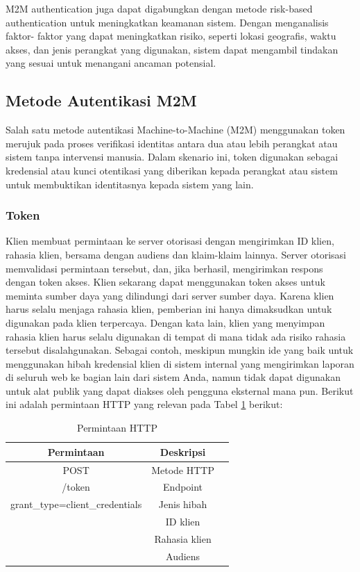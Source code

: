M2M authentication juga dapat digabungkan dengan metode risk-based authentication untuk meningkatkan keamanan sistem. Dengan menganalisis faktor- faktor yang dapat meningkatkan risiko, seperti lokasi geografis, waktu akses, dan jenis perangkat yang digunakan, sistem dapat mengambil tindakan yang sesuai untuk menangani ancaman potensial.

\subsection{Metode Autentikasi M2M}
Salah satu metode autentikasi Machine-to-Machine (M2M) menggunakan token merujuk pada proses verifikasi identitas antara dua atau lebih perangkat atau sistem tanpa intervensi manusia. Dalam skenario ini, token digunakan sebagai kredensial atau kunci otentikasi yang diberikan kepada perangkat atau sistem untuk membuktikan identitasnya kepada sistem yang lain.

\subsubsection{Token}
Klien membuat permintaan ke server otorisasi dengan mengirimkan ID klien, rahasia klien, bersama dengan audiens dan klaim-klaim lainnya. Server otorisasi memvalidasi permintaan tersebut, dan, jika berhasil, mengirimkan respons dengan token akses. Klien sekarang dapat menggunakan token akses untuk meminta sumber daya yang dilindungi dari server sumber daya.
Karena klien harus selalu menjaga rahasia klien, pemberian ini hanya dimaksudkan untuk digunakan pada klien terpercaya. Dengan kata lain, klien yang menyimpan rahasia klien harus selalu digunakan di tempat di mana tidak ada risiko rahasia tersebut disalahgunakan. Sebagai contoh, meskipun mungkin ide yang baik untuk menggunakan hibah kredensial klien di sistem internal yang mengirimkan laporan di seluruh web ke bagian lain dari sistem Anda, namun tidak dapat digunakan untuk alat publik yang dapat diakses oleh pengguna eksternal mana pun.
Berikut ini adalah permintaan HTTP yang relevan pada Tabel \ref{tab:req_http} berikut:

\begin{table}[H]
    \caption{Permintaan HTTP}
    \vspace{0.5em}
    \centering
    \begin{tabular}{|c|c|c|}
        \hline
        Permintaan & Deskripsi \\
        \hline \hline
        POST & Metode HTTP \\
        \hline
        /token & Endpoint \\
        \hline
        grant\_type=client\_credentials & Jenis hibah \\
        \hline
        & ID klien \\
        \hline
        & Rahasia klien \\
        \hline
        & Audiens \\
        \hline
    \end{tabular}
    \label{tab:req_http}
\end{table}

